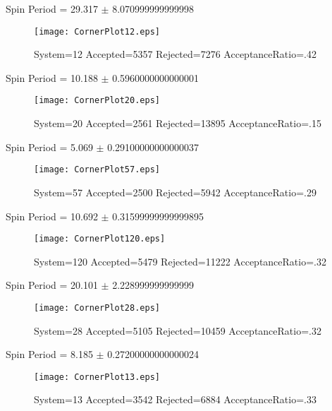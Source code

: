 \documentclass[10pt]{article}
\begin{document}
\newpage
\begin{center}
        Spin Period = 29.317 $\pm$ 8.070999999999998
        \end{center}
\begin{figure}[H] 
        \texttt{[image: CornerPlot12.eps]}
        \caption{System=12 Accepted=5357 Rejected=7276 AcceptanceRatio=.42}
        \label{S12}
        \centering
        \end{figure}
\newpage
\begin{center}
        Spin Period = 10.188 $\pm$ 0.5960000000000001
        \end{center}
\begin{figure}[H] 
        \texttt{[image: CornerPlot20.eps]}
        \caption{System=20 Accepted=2561 Rejected=13895 AcceptanceRatio=.15}
        \label{S20}
        \centering
        \end{figure}
\newpage
\begin{center}
        Spin Period = 5.069 $\pm$ 0.29100000000000037
        \end{center}
\begin{figure}[H] 
        \texttt{[image: CornerPlot57.eps]}
        \caption{System=57 Accepted=2500 Rejected=5942 AcceptanceRatio=.29}
        \label{S57}
        \centering
        \end{figure}
\newpage
\begin{center}
        Spin Period = 10.692 $\pm$ 0.31599999999999895
        \end{center}
\begin{figure}[H] 
        \texttt{[image: CornerPlot120.eps]}
        \caption{System=120 Accepted=5479 Rejected=11222 AcceptanceRatio=.32}
        \label{S120}
        \centering
        \end{figure}
\newpage
\begin{center}
        Spin Period = 20.101 $\pm$ 2.228999999999999
        \end{center}
\begin{figure}[H] 
        \texttt{[image: CornerPlot28.eps]}
        \caption{System=28 Accepted=5105 Rejected=10459 AcceptanceRatio=.32}
        \label{S28}
        \centering
        \end{figure}
\newpage
\begin{center}
        Spin Period = 8.185 $\pm$ 0.27200000000000024
        \end{center}
\begin{figure}[H] 
        \texttt{[image: CornerPlot13.eps]}
        \caption{System=13 Accepted=3542 Rejected=6884 AcceptanceRatio=.33}
        \label{S13}
        \centering
        \end{figure}
\end{document}

